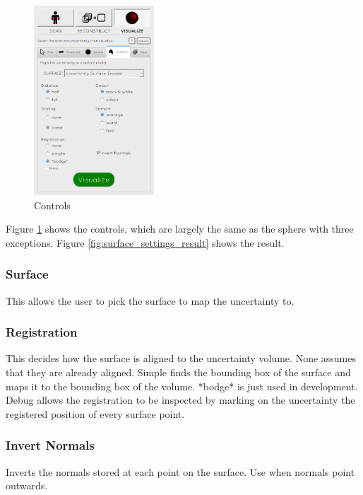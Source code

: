 \begin{figure}
  \vspace{-20pt}
  \includegraphics[width=0.4\textwidth]{images/tool/4_surface.png}
  \caption{Controls}\label{fig:surface_settings}
\end{figure}

Figure \ref{fig:surface_settings} shows the controls, which are largely the same as the sphere with three exceptions. Figure \ref{fig:surface_settings_result} shows the result.

\subsubsection{Surface}
This allows the user to pick the surface to map the uncertainty to.

\subsubsection{Registration}
This decides how the surface is aligned to the uncertainty volume. None assumes that they are already aligned. Simple finds the bounding box of the surface and maps it to the bounding box of the volume. *bodge* is just used in development. Debug allows the registration to be inspected by marking on the uncertainty the registered position of every surface point.

\subsubsection{Invert Normals}
Inverts the normals stored at each point on the surface. Use when normals point outwards.


